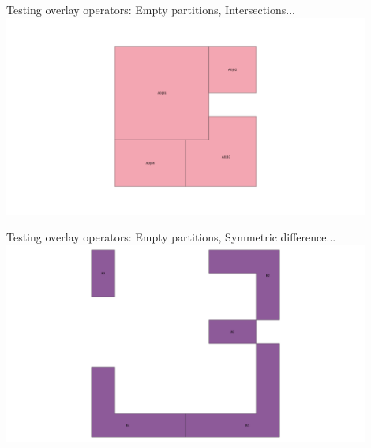 \documentclass{beamer}
\begin{document}
\begin{frame}{Testing overlay operators: Empty partitions, Intersections...}
    \centering
	\includegraphics[trim=1cm 0 1cm 0, clip, width=0.9\textwidth]{figures/Demo_Intersection}
\end{frame}
\begin{frame}{Testing overlay operators: Empty partitions, Symmetric difference...}
    \centering
	\includegraphics[trim=1cm 0 1cm 0, clip, width=0.9\textwidth]{figures/Demo_Symmetric}
\end{frame}
\end{document}
